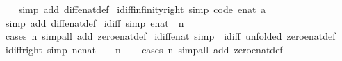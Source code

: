 \begin{isabellebody}
%
\isadelimproof
\ \ %
\endisadelimproof
%
\isatagproof
{}\isamarkupfalse%
\ {\isacharparenleft}simp\ add{\isacharcolon}\ diff{\isacharunderscore}enat{\isacharunderscore}def{\isacharparenright}%
\endisatagproof
{\isafoldproof}%
%
\isadelimproof
\isanewline
%
\endisadelimproof
\isanewline
{}\isamarkupfalse%
\ idiff{\isacharunderscore}infinity{\isacharunderscore}right\ {\isacharbrackleft}simp{\isacharcomma}\ code{\isacharbrackright}{\isacharcolon}\ {\isachardoublequoteopen}enat\ a\ {\isacharminus}\ {\isasyminfinity}\ {\isacharequal}\ {}{\isachardoublequoteclose}\isanewline
%
\isadelimproof
\ \ %
\endisadelimproof
%
\isatagproof
{}\isamarkupfalse%
\ {\isacharparenleft}simp\ add{\isacharcolon}\ diff{\isacharunderscore}enat{\isacharunderscore}def{\isacharparenright}%
\endisatagproof
{\isafoldproof}%
%
\isadelimproof
\isanewline
%
\endisadelimproof
\isanewline
{}\isamarkupfalse%
\ idiff{\isacharunderscore}{}\ {\isacharbrackleft}simp{\isacharbrackright}{\isacharcolon}\ {\isachardoublequoteopen}{\isacharparenleft}{}{\isacharcolon}{\isacharcolon}enat{\isacharparenright}\ {\isacharminus}\ n\ {\isacharequal}\ {}{\isachardoublequoteclose}\isanewline
%
\isadelimproof
\ \ %
\endisadelimproof
%
\isatagproof
{}\isamarkupfalse%
\ {\isacharparenleft}cases\ n{\isacharcomma}\ simp{\isacharunderscore}all\ add{\isacharcolon}\ zero{\isacharunderscore}enat{\isacharunderscore}def{\isacharparenright}%
\endisatagproof
{\isafoldproof}%
%
\isadelimproof
\isanewline
%
\endisadelimproof
\isanewline
{}\isamarkupfalse%
\ idiff{\isacharunderscore}enat{\isacharunderscore}{}\ {\isacharbrackleft}simp{\isacharbrackright}\ {\isacharequal}\ idiff{\isacharunderscore}{}\ {\isacharbrackleft}unfolded\ zero{\isacharunderscore}enat{\isacharunderscore}def{\isacharbrackright}\isanewline
\isanewline
{}\isamarkupfalse%
\ idiff{\isacharunderscore}{}{\isacharunderscore}right\ {\isacharbrackleft}simp{\isacharbrackright}{\isacharcolon}\ {\isachardoublequoteopen}{\isacharparenleft}n{\isacharcolon}{\isacharcolon}enat{\isacharparenright}\ {\isacharminus}\ {}\ {\isacharequal}\ n{\isachardoublequoteclose}\isanewline
%
\isadelimproof
\ \ %
\endisadelimproof
%
\isatagproof
{}\isamarkupfalse%
\ {\isacharparenleft}cases\ n{\isacharparenright}\ {\isacharparenleft}simp{\isacharunderscore}all\ add{\isacharcolon}\ zero{\isacharunderscore}enat{\isacharunderscore}def{\isacharparenright}%
\endisatagproof
{\isafoldproof}%

\end{isabellebody}
